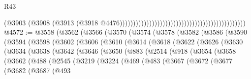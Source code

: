 \begin{lexlean}{R43}
\begin{coremodule}
                                                                                          (@3903
                                                                                            (@3908
                                                                                              (@3913
                                                                                                (@3918
                                                                                                  @4476)))))))))))))))))))))))))))))))))))))))))))))))
@4572 := @3558
    (@3562
      (@3566
        (@3570
          (@3574
            (@3578
              (@3582
                (@3586
                  (@3590
                    (@3594
                      (@3598
                        (@3602
                          (@3606
                            (@3610
                              (@3614
                                (@3618
                                  (@3622
                                    (@3626
                                      (@3630
                                        (@3634
                                          (@3638
                                            (@3642
                                              (@3646
                                                (@3650
                                                  (@883
                                                    (@2514
                                                      (@918
                                                        (@3654
                                                          (@3658
                                                            (@3662
                                                              (@488
                                                                (@2545
                                                                  (@3219
                                                                    (@3224
                                                                      (@469
                                                                        (@483
                                                                          (@3667
                                                                            (@3672
                                                                              (@3677
                                                                                (@3682
                                                                                  (@3687
                                                                                    (@493

\end{coremodule}
\end{lexlean}
